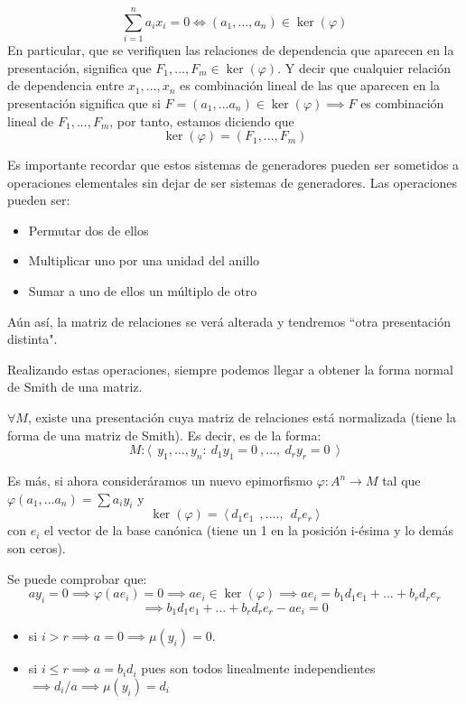 \begin{nprop}
	\[
	\sum_{i=1}^n a_i x_i  = 0 \iff (a_1,...,a_n) \in \ker(\varphi)
	\]
	En particular, que se verifiquen las relaciones de dependencia que aparecen en la presentación, significa que $F_1,...,F_m \in \ker(\varphi)$.
	Y decir que cualquier relación de dependencia entre $x_1,...,x_n$ es combinación lineal de las que aparecen en la presentación significa que si $F=(a_1,...a_n) \in \ker(\varphi) \implies F$ es combinación lineal de $F_1,...,F_m$, por tanto, estamos diciendo que
	\[
	\ker(\varphi) = (F_1,...,F_m)
	\]
\end{nprop}

\begin{nota}
	Es importante recordar que estos sistemas de generadores pueden ser sometidos a operaciones elementales sin dejar de ser sistemas de generadores. Las operaciones pueden ser:
	\begin{itemize}
	\item Permutar dos de ellos
	\item Multiplicar uno por una unidad del anillo
	\item Sumar a uno de ellos un múltiplo de otro
\end{itemize}
Aún así, la matriz de relaciones se verá alterada y tendremos “otra presentación distinta".
\end{nota}

Realizando estas operaciones, siempre podemos llegar a obtener la forma normal de Smith de una matriz.

\begin{nprop}
	$\forall M $, existe una presentación cuya matriz de relaciones está normalizada (tiene la forma de una matriz de Smith). Es decir, es de la forma:
	\[
	M : \langle \ \  y_1,...,y_n : \ d_1y_1 = 0 \ ,..., \ d_ry_r = 0 \ \  \rangle
	\]

\end{nprop}
Es más, si ahora consideráramos un nuevo epimorfismo $\varphi: A^n \to M$ tal que $\varphi (a_1,...a_n) = \sum a_i y_i$ y
\[
\ker(\varphi)= \ \langle\  d_1e_1 \ \ , .... , \ \ d_r e_r \ \rangle
\]
con $e_i$ el vector de la base canónica (tiene un 1 en la posición i-ésima y lo demás son ceros).

\begin{nprop}
	Se puede comprobar que:
	\[
	ay_i = 0 \implies \varphi (ae_i) = 0 \implies ae_i \in \ker(\varphi) \implies ae_i = b_1d_1e_1+...+b_rd_re_r
	\]
	\[
	\implies b_1d_1e_1+...+b_rd_re_r - ae_i = 0
	\]
	\begin{itemize}
	\item  si $i>r \implies a = 0 \implies \mu(y_i) = 0$.
	\item si $i \leq r \implies a = b_id_i$ pues son todos linealmente independientes $\implies d_i/a \implies \mu(y_i) = d_i$
\end{itemize}
\end{nprop}


